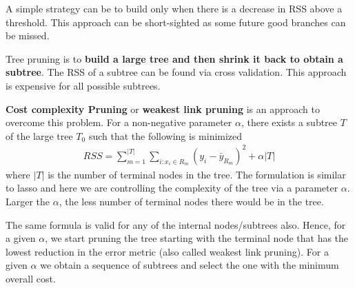 \documentclass[../statistical_learning_notes.tex]{subfiles}
\begin{document}
    A simple strategy can be to build only when there is a decrease in RSS above a threshold. This approach can be short-sighted as some future good branches can be missed.\newline

    Tree pruning is to \textbf{build a large tree and then shrink it back to obtain a subtree}. The RSS of a subtree can be found via cross validation. This approach is expensive for all possible subtrees.\newline

    \textbf{Cost complexity Pruning} or \textbf{weakest link pruning} is an approach to overcome this problem. For a non-negative parameter $\alpha$, there exists a subtree $T$ of the large tree $T_{0}$ such that the following is minimized
    \begin{align*}
        RSS = \sum_{m=1}^{\vert T \vert} \sum_{i:x_{i}\in R_{m}} (y_{i} - \bar{y}_{R_{m}})^{2} + \alpha \vert T \vert
    \end{align*}
    where $\vert T \vert$ is the number of terminal nodes in the tree. The formulation is similar to lasso and here we are controlling the complexity of the tree via a parameter $\alpha$. Larger the $\alpha$, the less number of terminal nodes there would be in the tree.\newline

    The same formula is valid for any of the internal nodes/subtrees also. Hence, for a given $\alpha$, we start pruning the tree starting with the terminal node that has the lowest reduction in the error metric (also called weakest link pruning). For a given $\alpha$ we obtain a sequence of subtrees and select the one with the minimum overall cost.\newline
\end{document}
